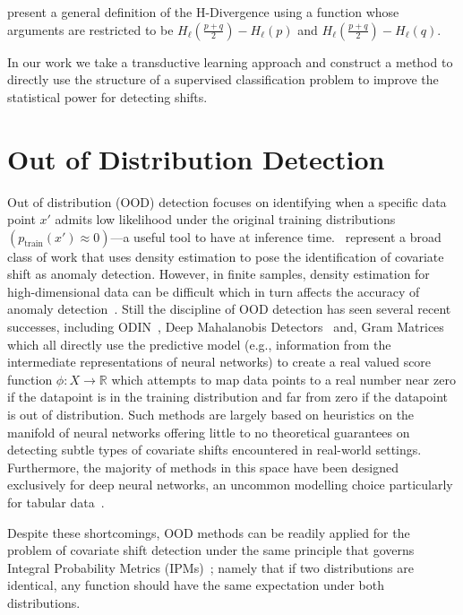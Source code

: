 \citeauthor{zhao2022comparing} present a general definition of the H-Divergence using a function whose arguments are restricted to be $H_\ell\left( \frac{p+q}{2} \right) - H_\ell(p)$ and $H_\ell\left( \frac{p+q}{2} \right) - H_\ell(q)$.


In our work we take a transductive learning approach and construct a method to directly use the structure of a supervised classification problem to improve the statistical power for detecting shifts.


\section{Out of Distribution Detection}\label{sec:out-of-distribution-detection}
Out of distribution (OOD) detection focuses on identifying when a specific data point $x'$ admits low likelihood under the original training distributions
$(p_{\text{train}}(x') \approx 0)$---a useful tool to have at inference time.~\cite{densityratio, densityofstates} represent a broad class of work that uses density estimation
to pose the identification of covariate shift as anomaly detection.
However, in finite samples, density estimation for high-dimensional data can be difficult which in turn affects the accuracy of anomaly detection~\citep{failuresofgen}.
Still the discipline of OOD detection has seen several recent successes, including ODIN~\citep{ODIN}, Deep Mahalanobis Detectors~\citep{mahalano}
and, Gram Matrices~\citep{grammat} which all directly use the predictive model (e.g., information from the intermediate representations of neural networks) to create a real valued score function $\phi: X\to \mathbb{R}$
which attempts to map data points to a real number near zero if the datapoint is in the training distribution and far from zero if the datapoint is out of distribution.
Such methods are largely based on heuristics on the manifold of neural networks offering little to no theoretical guarantees on detecting subtle types of covariate shifts encountered in real-world settings.
Furthermore, the majority of methods in this space have been designed exclusively for deep neural networks, an uncommon modelling choice particularly for tabular data~\citep{tabdatasurvey}.

Despite these shortcomings, OOD methods can be readily applied for the problem of covariate shift detection under the same principle that governs Integral Probability Metrics (IPMs)~\citep{IPMS}; namely that if two
distributions are identical, any function should have the same expectation under both distributions.


